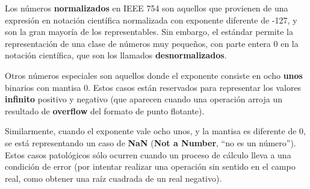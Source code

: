 \documentclass[spanish,a4paper,]{article}
\begin{document}
Los números \textbf{normalizados} en IEEE 754 son aquellos que provienen
de una expresión en notación científica normalizada con exponente
diferente de -127, y son la gran mayoría de los representables. Sin
embargo, el estándar permite la representación de una clase de números
muy pequeños, con parte entera 0 en la notación científica, que son los
llamados \textbf{desnormalizados}.

Otros números especiales son aquellos donde el exponente consiste en
ocho \textbf{unos} binarios con mantisa 0. Estos casos están reservados
para representar los valores \textbf{infinito} positivo y negativo (que
aparecen cuando una operación arroja un resultado de \textbf{overflow}
del formato de punto flotante).

Similarmente, cuando el exponente vale ocho unos, y la mantisa es
diferente de 0, se está representando un caso de \textbf{NaN}
(\textbf{Not a Number}, ``no es un número''). Estos casos patológicos
sólo ocurren cuando un proceso de cálculo lleva a una condición de error
(por intentar realizar una operación sin sentido en el campo real, como
obtener una raíz cuadrada de un real negativo).
\end{document}
